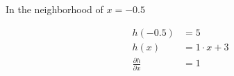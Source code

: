 
In the neighborhood of $x = -0.5$

\begin{align*}
    h(-0.5) &= 5 \\
    h(x) &= 1 \cdot x + 3\\
    \frac{\partial h}{\partial x} &= 1
\end{align*}
